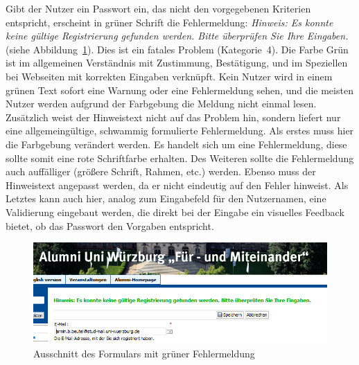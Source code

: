 {
Gibt der Nutzer ein Passwort ein, das nicht den vorgegebenen Kriterien entspricht, erscheint in grüner Schrift die Fehlermeldung: \emph{Hinweis: Es konnte keine gültige Registrierung gefunden werden. Bitte überprüfen Sie Ihre Eingaben.} (siehe Abbildung~\ref{fig:greenerror}).
}
{
Dies ist ein fatales Problem (Kategorie~4). Die Farbe Grün ist im allgemeinen Verständnis mit Zustimmung, Bestätigung, und im Speziellen bei Webseiten mit korrekten Eingaben verknüpft. Kein Nutzer wird in einem grünen Text sofort eine Warnung oder eine Fehlermeldung sehen, und die meisten Nutzer werden aufgrund der Farbgebung die Meldung nicht einmal lesen. Zusätzlich weist der Hinweistext nicht auf das Problem hin, sondern liefert nur eine allgemeingültige, schwammig formulierte Fehlermeldung.
}
{
Als erstes muss hier die Farbgebung verändert werden. Es handelt sich um eine Fehlermeldung, diese sollte somit eine rote Schriftfarbe erhalten. Des Weiteren sollte die Fehlermeldung auch auffälliger (größere Schrift, Rahmen, etc.) werden. Ebenso muss der Hinweistext angepasst werden, da er nicht eindeutig auf den Fehler hinweist. Als Letztes kann auch hier, analog zum Eingabefeld für den Nutzernamen, eine Validierung eingebaut werden, die direkt bei der Eingabe ein visuelles Feedback bietet, ob das Passwort den Vorgaben entspricht.
}
\label{prob:frei:warntextgruen}

\begin{figure}
	\centering
		\includegraphics[width=\textwidth]{figures/greenerror.png}
	\caption{Ausschnitt des Formulars mit grüner Fehlermeldung}
	\label{fig:greenerror}
\end{figure}

